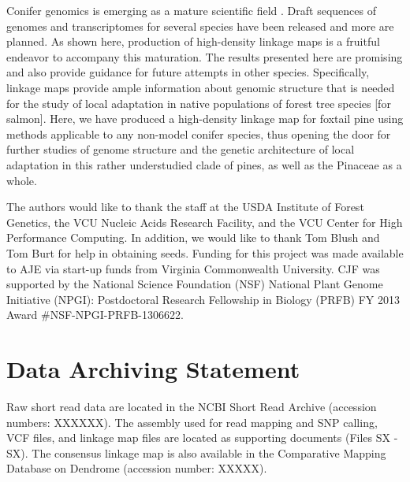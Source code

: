 \documentclass[smallextended]{svjour3}
\begin{document}
Conifer genomics is emerging as a mature scientific field \citep{Mackay:2012}. Draft sequences of genomes and transcriptomes for
several species have been released and more are planned. As shown here, production of high-density linkage maps is a fruitful endeavor to 
accompany this maturation. The results presented here are promising and also provide guidance for future attempts in other species.
Specifically, linkage maps provide ample information about genomic structure that is needed for the study
of local adaptation in native populations of forest tree species \citep[cf.,][]{Limborg:2014}[for salmon]. Here, we have produced a high-density linkage map for
foxtail pine using methods applicable to any non-model conifer species, thus opening the door for further studies of 
genome structure and the genetic architecture  of local adaptation in this rather understudied clade of pines, 
as well as the Pinaceae as a whole. 

\begin{acknowledgements}
The authors would like to thank the staff at the USDA Institute of Forest Genetics, the 
VCU Nucleic Acids Research Facility, and the VCU Center for High Performance Computing. 
In addition, we would like to thank Tom Blush and Tom Burt for help in obtaining 
seeds. Funding for this project was made available to AJE via start-up funds from Virginia 
Commonwealth University. CJF was supported by the National Science Foundation (NSF) National Plant Genome 
Initiative (NPGI): Postdoctoral Research Fellowship in Biology (PRFB) FY 2013 Award \#NSF-NPGI-PRFB-1306622.
\end{acknowledgements}


\section*{Data Archiving Statement}

Raw short read data are located in the NCBI Short Read Archive (accession numbers: XXXXXX). 
The assembly used for read mapping and SNP calling, VCF files, and linkage map files 
are located as supporting documents (Files SX - SX). 
The consensus linkage map is also available in the Comparative Mapping Database on Dendrome (accession number: XXXXX).


\clearpage




\end{document}
